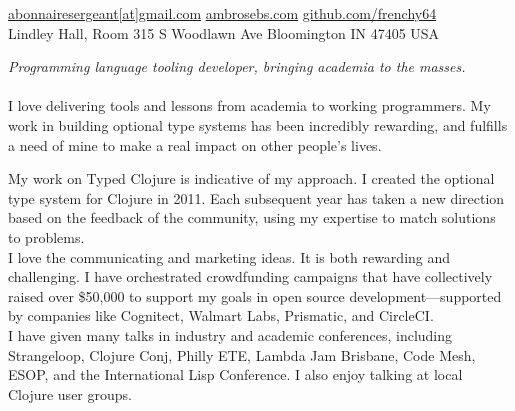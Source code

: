 \documentclass[10pt,a4paper]{article}
\begin{document}
\sloppy  %



\nobreakvspace{0.3em}  %

\noindent\href{mailto:abonnairesergeant.at.gmail.dot.com}{abonnairesergeant\mbox{}[at]\mbox{}gmail.com}\sbull
\href{http://ambrosebs.com/}{ambrosebs.com}\sbull
\href{https://github.com/frenchy64}{github.com/frenchy64}
\\
Lindley Hall, Room 315 S Woodlawn Ave \sbull
Bloomington \sbull 
IN 47405 \sbull
USA


\spacedhrule{0.9em}{-0.4em}  %


\vspace{-1.3em}  %
\begin{multicols}{2}  %
\noindent 
\emph{Programming language tooling developer, bringing academia to the masses.}
\\
\\
I love delivering tools and lessons from academia to working programmers.
My work in building optional type systems has been incredibly
rewarding, and fulfills a need of mine to make a real impact
on other people's lives.

My work on Typed Clojure is indicative of my approach.
I created the optional type system for Clojure
in 2011.
Each subsequent year has taken a new direction
based on the feedback of the community, using my 
expertise to match solutions to problems.
\\

I love the communicating and marketing ideas.
It is both rewarding and challenging.
I have orchestrated crowdfunding campaigns that have
collectively raised
over \$50,000 to support my goals in open source 
development---supported by companies like Cognitect, Walmart Labs, Prismatic,
and CircleCI.
\\

I have given many talks in industry and academic conferences, including
Strangeloop, Clojure Conj, Philly ETE, Lambda Jam Brisbane, Code
Mesh, ESOP, and the International Lisp Conference.
I also enjoy talking at local Clojure user groups.
\end{multicols}
\end{document}
